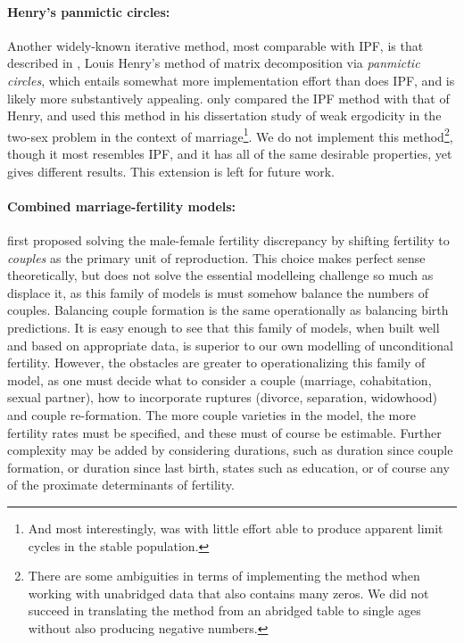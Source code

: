 \paragraph{Henry's panmictic circles: } Another widely-known iterative method, 
most comparable with IPF, is that described in \citet{henry1972nuptiality},
Louis Henry's method of matrix decomposition via \textit{panmictic circles}, which entails somewhat more
implementation effort than does IPF, and is likely more substantively appealing. 
\citet{mc1975models} only compared the
IPF method with that of Henry, and \citet{wijewickrema1980weak} used this method 
in his dissertation study of weak ergodicity in the two-sex problem in the
context of marriage\footnote{And most interestingly, was with little
effort able to produce apparent limit cycles in the stable population.}. We do
not implement this method\footnote{There are some ambiguities in terms of 
implementing the method when working with unabridged data that also contains 
many zeros. We did not succeed in translating the method from an
abridged table to single ages without also producing negative numbers.}, though
it most resembles IPF, and it has all of the same desirable properties, yet
gives different results. This extension is left for future work.



\paragraph{Combined marriage-fertility models: } \citet{karmel1947relations}
first proposed solving the male-female fertility discrepancy by shifting
fertility to \textit{couples} as the primary unit of reproduction. This choice
makes perfect sense theoretically, but does not solve the essential modelleing
challenge so much as displace it, as this family of models is
must somehow balance the numbers of couples. Balancing couple formation is the
same operationally as balancing birth predictions. It is easy enough to see that
this family of models, when built well and based on appropriate data, is
superior to our own modelling of unconditional fertility. However, the
obstacles are greater to operationalizing this family of model, as one must
decide what to consider a couple (marriage, cohabitation, sexual
partner), how to incorporate ruptures (divorce, separation, widowhood) and
couple re-formation. The more couple varieties in the model, the more fertility
rates must be specified, and these must of course be estimable. Further
complexity may be added by considering durations, such as duration since 
couple formation, or duration since last birth, states such as
education, or of course any of the proximate determinants of
fertility\citep{bongaarts1982fertility, bongaarts1978framework,
bongaarts1983fertility}. 

